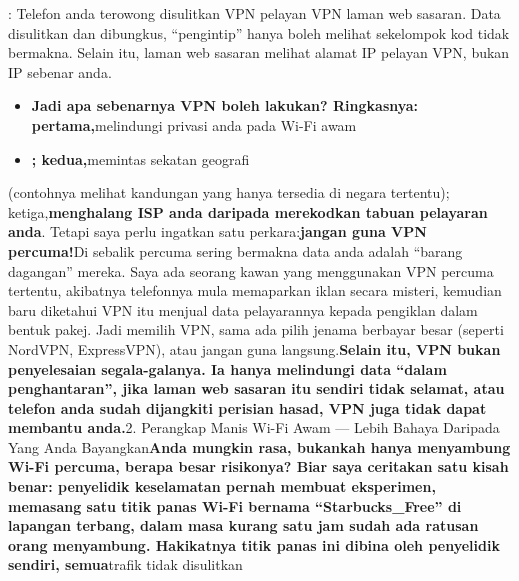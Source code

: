 


: Telefon anda terowong disulitkan VPN pelayan VPN laman web sasaran. Data disulitkan dan dibungkus, “pengintip” hanya boleh melihat sekelompok kod tidak bermakna. Selain itu, laman web sasaran melihat alamat IP pelayan VPN, bukan IP sebenar anda.

\begin{itemize}
  \item \textbf{Jadi apa sebenarnya VPN boleh lakukan? Ringkasnya: pertama,}melindungi privasi anda pada Wi-Fi awam
  \item \textbf{; kedua,}memintas sekatan geografi
\end{itemize}

(contohnya melihat kandungan yang hanya tersedia di negara tertentu); ketiga,\textbf{menghalang ISP anda daripada merekodkan tabuan pelayaran anda}. Tetapi saya perlu ingatkan satu perkara:\textbf{jangan guna VPN percuma!}Di sebalik percuma sering bermakna data anda adalah “barang dagangan” mereka. Saya ada seorang kawan yang menggunakan VPN percuma tertentu, akibatnya telefonnya mula memaparkan iklan secara misteri, kemudian baru diketahui VPN itu menjual data pelayarannya kepada pengiklan dalam bentuk pakej. Jadi memilih VPN, sama ada pilih jenama berbayar besar (seperti NordVPN, ExpressVPN), atau jangan guna langsung.\textbf{Selain itu, VPN bukan penyelesaian segala-galanya. Ia hanya melindungi data “dalam penghantaran”, jika laman web sasaran itu sendiri tidak selamat, atau telefon anda sudah dijangkiti perisian hasad, VPN juga tidak dapat membantu anda.}2. Perangkap Manis Wi-Fi Awam — Lebih Bahaya Daripada Yang Anda Bayangkan\textbf{Anda mungkin rasa, bukankah hanya menyambung Wi-Fi percuma, berapa besar risikonya? Biar saya ceritakan satu kisah benar: penyelidik keselamatan pernah membuat eksperimen, memasang satu titik panas Wi-Fi bernama “Starbucks\_Free” di lapangan terbang, dalam masa kurang satu jam sudah ada ratusan orang menyambung. Hakikatnya titik panas ini dibina oleh penyelidik sendiri, semua}trafik tidak disulitkan


